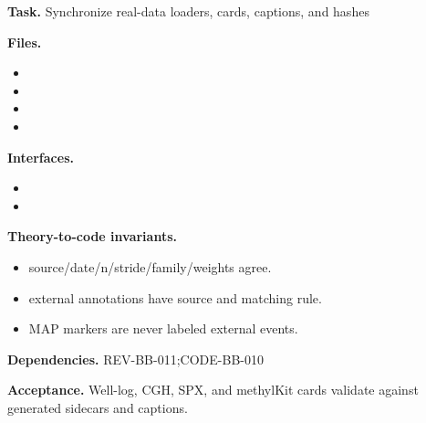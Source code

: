 \begin{statusbox}[CODE-BB-011]
\textbf{Task.} Synchronize real-data loaders, cards, captions, and hashes\par
\textbf{Files.}
\begin{itemize}[leftmargin=1.7em,itemsep=1.5pt,topsep=2pt]
\item {}
\item {}
\item {}
\item {}
\end{itemize}
\textbf{Interfaces.}
\begin{itemize}[leftmargin=1.7em,itemsep=1.5pt,topsep=2pt]
\item {}
\item {}
\end{itemize}
\textbf{Theory-to-code invariants.}
\begin{itemize}[leftmargin=1.7em,itemsep=1.5pt,topsep=2pt]
\item source/date/n/stride/family/weights agree.
\item external annotations have source and matching rule.
\item MAP markers are never labeled external events.
\end{itemize}
\textbf{Dependencies.} REV-BB-011;CODE-BB-010\par
\textbf{Acceptance.} Well-log, CGH, SPX, and methylKit cards validate against generated sidecars and captions.
\end{statusbox}

